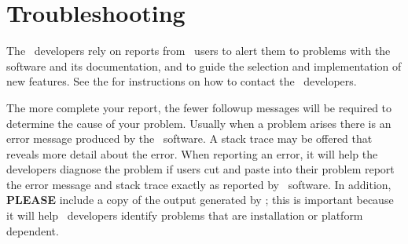 
\section{Troubleshooting}\label{sec:trouble}

The \OOMMF\ developers rely on reports from \OOMMF\ users to alert them
to problems with the software and its
documentation, and to guide the selection and implementation of new
features.  See the  for instructions on how to contact the
\OOMMF\ developers.

The more complete your report, the fewer followup messages will be
required to determine the cause of your problem.  Usually when a problem
arises there is an error message produced by the \OOMMF\ software.  A
stack trace may be offered that reveals more detail about the error.
When reporting an error, it will help the developers diagnose the
problem if users cut and paste into their problem report the error
message and stack trace exactly as reported by \OOMMF\ software.  In
addition, \textbf{PLEASE} include a copy of the output generated by
; this is important
because it will help \OOMMF\ developers identify problems that are
installation or platform dependent.


